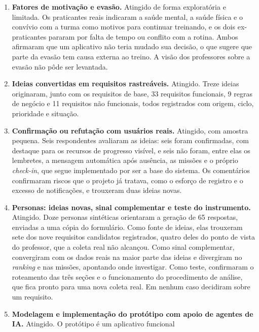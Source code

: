 \begin{enumerate}
  \item \textbf{Fatores de motivação e evasão.} Atingido de forma
        exploratória e limitada. Os praticantes reais indicaram a saúde
        mental, a saúde física e o convívio com a turma como motivos para
        continuar treinando, e os dois ex-praticantes pararam por falta de
        tempo ou conflito com a rotina. Ambos afirmaram que um aplicativo
        não teria mudado sua decisão, o que sugere que parte da evasão tem
        causa externa ao treino. A visão dos professores sobre a evasão não
        pôde ser levantada.
  \item \textbf{Ideias convertidas em requisitos rastreáveis.} Atingido.
        Treze ideias originaram, junto com os requisitos de base, 33
        requisitos funcionais, 9 regras de negócio e 11 requisitos não
        funcionais, todos registrados com origem, ciclo, prioridade e
        situação.
  \item \textbf{Confirmação ou refutação com usuários reais.} Atingido,
        com amostra pequena. Seis respondentes avaliaram as ideias: seis
        foram confirmadas, com destaque para os recursos de progresso
        visível, e seis não foram, entre elas os lembretes, a mensagem
        automática após ausência, as missões e o próprio
        \textit{check-in}, que segue implementado por ser a base do
        sistema. Os comentários confirmaram riscos que o projeto já
        tratava, como o esforço de registro e o excesso de notificações,
        e trouxeram duas ideias novas.
  \item \textbf{Personas: ideias novas, sinal complementar e teste do
        instrumento.} Atingido. Doze personas sintéticas orientaram a
        geração de 65 respostas, enviadas a uma cópia do formulário. Como
        fonte de ideias, elas trouxeram sete dos nove requisitos
        candidatos registrados, quatro deles do ponto de vista do
        professor, que a coleta real não alcançou. Como sinal
        complementar, convergiram com os dados reais na maior parte das
        ideias e divergiram no \textit{ranking} e nas missões, apontando
        onde investigar. Como teste, confirmaram o roteamento das três
        seções e o funcionamento do procedimento de análise, que fica
        pronto para uma nova coleta real. Em nenhum caso decidiram sobre
        um requisito.
  \item \textbf{Modelagem e implementação do protótipo com apoio de
        agentes de IA.} Atingido. O protótipo é um aplicativo funcional

\end{enumerate}
